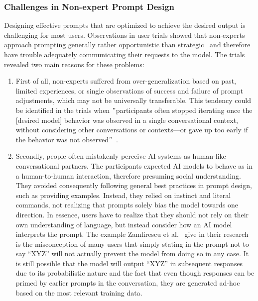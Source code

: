 \subsubsection{Challenges in Non-expert Prompt Design}
Designing effective prompts that are optimized to achieve the desired output is challenging for
most users.
Observations in user trials showed that non-experts approach prompting generally rather
opportunistic than strategic~\cite{zamfirescu-pereira_why_2023} and therefore have trouble
adequately communicating their requests to the model.
The trials revealed two main reasons for these problems:
\begin{enumerate}
    \item First of all, non-experts suffered from over-generalization based on past, limited experiences,
    or single observations of success and failure of prompt adjustments, which may not be universally
    transferable. %
    This tendency could be identified in the trials when \("\)participants often stopped iterating
    once the [desired model] behavior was observed in a single conversational context,
    without considering other conversations or contexts—or gave up too early
    if the behavior was not observed\("\)~\cite[p. 10]{zamfirescu-pereira_why_2023}.
    \item Secondly, people often mistakenly perceive AI systems as human-like conversational
    partners.
    The participants expected AI models to behave as in a human-to-human interaction,
    therefore presuming social understanding.
    They avoided consequently following general best practices in prompt design, such as providing
    examples.
    Instead, they relied on instinct and literal commands, not realizing that prompts
    solely bias the model towards one direction.
    In essence, users have to realize that they should not rely on their own understanding of
    language, but instead consider how an AI model interprets the prompt.
    The example Zamfirescu et al\(.\)~\cite{zamfirescu-pereira_why_2023} give in their research
    is the misconception of many users that simply stating in the prompt not to say ``XYZ''
    will not actually prevent the model from doing so in any case.
    It is still possible that the model will output ``XYZ'' in subsequent responses due to
    its probabilistic nature and the fact that even though responses can be primed
    by earlier prompts in the conversation, they are generated ad-hoc based on the most relevant
    training data.
\end{enumerate}

